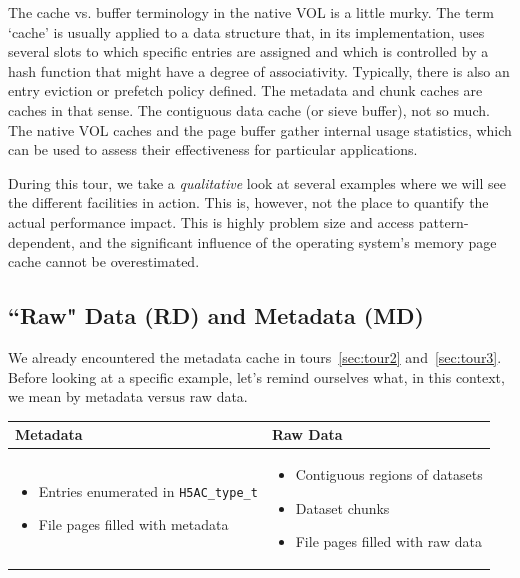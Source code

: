 The cache vs. buffer terminology in the native VOL is a little murky. The term `cache' is usually applied to a data structure that, in its implementation, uses several slots to which specific entries are assigned and which is controlled by a hash function that might have a degree of associativity. Typically, there is also an entry eviction or prefetch policy defined. The metadata and chunk caches are caches in that sense. The contiguous data cache (or sieve buffer), not so much. The native VOL caches and the page buffer gather internal usage statistics, which can be used to assess their effectiveness for particular applications.

During this tour, we take a \textit{qualitative} look at several examples where we will see the different facilities in action. This is, however, not the place to quantify the actual performance impact. This is highly problem size and access pattern-dependent, and the significant influence of the operating system's memory page cache cannot be overestimated.

\subsection{``Raw" Data (RD) and Metadata (MD)}

We already encountered the metadata cache in tours~\ref{sec:tour2} and~\ref{sec:tour3}. Before looking at a specific example, let's remind ourselves what, in this context, we mean by metadata versus raw data.

\begin{center}
\begin{tabular}{ | m{20em} | m{20em} | }
  \hline
  \textbf{Metadata} & \textbf{Raw Data} \\ \hline
  \begin{itemize}
      \item Entries enumerated in \texttt{H5AC\_type\_t}
      \item File pages filled with metadata
  \end{itemize}
  &
  \begin{itemize}
  \item Contiguous regions of datasets
  \item Dataset chunks
  \item File pages filled with raw data
  \end{itemize} \\ 
  \hline
\end{tabular}
\end{center}

